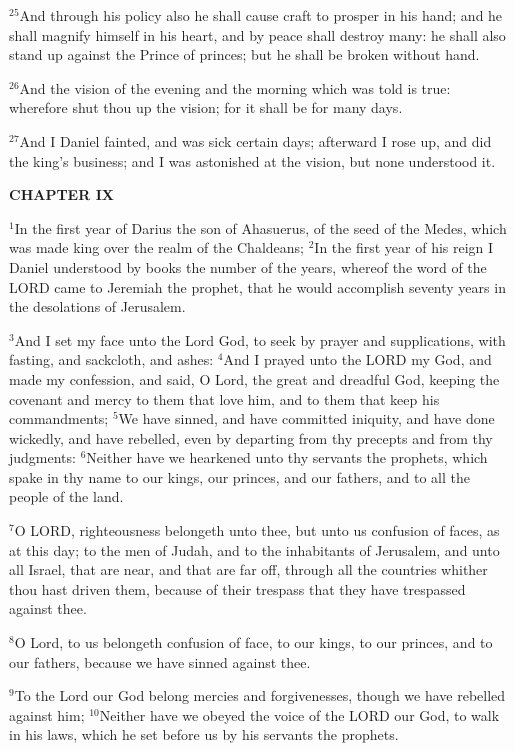 \documentclass[12pt]{article}
\begin{document}
$^{25}$And through his policy also he shall cause craft to prosper in
his hand; and he shall magnify himself in his heart, and by peace
shall destroy many: he shall also stand up against the Prince of
princes; but he shall be broken without hand.


$^{26}$And the vision of the evening and the morning which was told is
true: wherefore shut thou up the vision; for it shall be for many
days.


$^{27}$And I Daniel fainted, and was sick certain days; afterward I rose
up, and did the king's business; and I was astonished at the vision,
but none understood it.





\begin{center}
\textbf{\small CHAPTER IX}
\end{center}
$^{1}$In the first year of Darius the son of Ahasuerus, of the seed of
the Medes, which was made king over the realm of the Chaldeans; $^{2}$In
the first year of his reign I Daniel understood by books the number of
the years, whereof the word of the LORD came to Jeremiah the prophet,
that he would accomplish seventy years in the desolations of
Jerusalem.


$^{3}$And I set my face unto the Lord God, to seek by prayer and
supplications, with fasting, and sackcloth, and ashes: $^{4}$And I
prayed unto the LORD my God, and made my confession, and said, O Lord,
the great and dreadful God, keeping the covenant and mercy to them
that love him, and to them that keep his commandments; $^{5}$We have
sinned, and have committed iniquity, and have done wickedly, and have
rebelled, even by departing from thy precepts and from thy judgments:
$^{6}$Neither have we hearkened unto thy servants the prophets, which
spake in thy name to our kings, our princes, and our fathers, and to
all the people of the land.


$^{7}$O LORD, righteousness belongeth unto thee, but unto us confusion
of faces, as at this day; to the men of Judah, and to the inhabitants
of Jerusalem, and unto all Israel, that are near, and that are far
off, through all the countries whither thou hast driven them, because
of their trespass that they have trespassed against thee.


$^{8}$O Lord, to us belongeth confusion of face, to our kings, to our
princes, and to our fathers, because we have sinned against thee.


$^{9}$To the Lord our God belong mercies and forgivenesses, though we
have rebelled against him; $^{10}$Neither have we obeyed the voice of
the LORD our God, to walk in his laws, which he set before us by his
servants the prophets.
\end{document}
